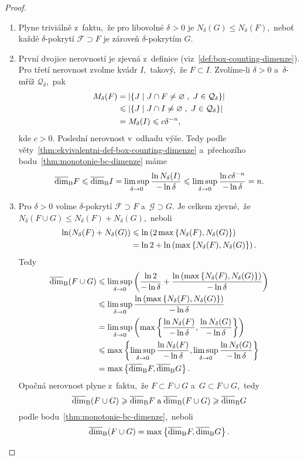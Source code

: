 \begin{proof}
    \begin{enumerate}[label=\textit{(\roman*)}]
        \item Plyne triviálně z~faktu,~že pro libovolné $\delta>0$ je $N_\delta(G)\leqslant N_\delta(F)$,~neboť každé $\delta$-pokrytí $\mathcal{F}\supset F$ je zároveň $\delta$-pokrytím $G$.
        \item První dvojice nerovností je zjevná z~definice (viz~\ref{def:box-counting-dimenze}). Pro třetí nerovnost zvolme kvádr $I$,~takový,~že $F\subset I$. Zvolíme-li $\delta>0$ a~$\delta$-mříž $\mathcal{Q}_\delta$,~pak
        \begin{align*}
            M_\delta(F)&=\left|\left\{J\;\middle|\;J\cap F\neq\varnothing\;,\;J\in\mathcal{Q}_\delta\right\}\right|\\
            &\leqslant \left|\left\{J\;\middle|\;J\cap I\neq\varnothing\;,\;J\in\mathcal{Q}_\delta\right\}\right|\\
            &=M_\delta(I)\leqslant c\delta^{-n},
        \end{align*}
        kde $c>0$. Poslední nerovnost v~odhadu výše. Tedy podle věty~\ref{thm:ekvivalentni-def-box-counting-dimenze} a~přechozího bodu~\ref{thm:monotonie-bc-dimenze} máme
        \[\overline{\dim}_\textup{B}{F}\leqslant\overline{\dim}_\textup{B}{I}=\limsup_{\delta\to 0}\dfrac{\ln{N_\delta(I)}}{-\ln{\delta}}\leqslant\limsup_{\delta\to 0}\dfrac{\ln{c\delta^{-n}}}{-\ln{\delta}}=n.\]
        \item Pro $\delta>0$ volme $\delta$-pokrytí $\mathcal{F}\supset F$ a~$\mathcal{G}\supset G$. Je celkem zjevné,~že $N_\delta(F\cup G)\leqslant N_\delta(F)+N_\delta(G)$,~neboli
        \begin{align*}
            \ln(N_\delta(F)+N_\delta(G))&\leqslant \ln\left(2\max\left\{N_\delta(F),N_\delta(G)\right\}\right)\\
            &=\ln{2}+\ln\left(\max\left\{N_\delta(F),N_\delta(G)\right\}\right).
        \end{align*}
        Tedy
        \begin{align*}
            \overline{\dim}_\textup{B}(F\cup G)&\leqslant\limsup_{\delta\to 0}\left(\dfrac{\ln{2}}{-\ln{\delta}}+\dfrac{\ln\left(\max\left\{N_\delta(F),N_\delta(G)\right\}\right)}{-\ln{\delta}}\right)\\
            &\leqslant\limsup_{\delta\to 0}\dfrac{\ln\left(\max\left\{N_\delta(F),N_\delta(G)\right\}\right)}{-\ln{\delta}}\\
            &=\limsup_{\delta\to 0}\left(\max\left\{\dfrac{\ln{N_\delta(F)}}{-\ln{\delta}},\dfrac{\ln{N_\delta(G)}}{-\ln{\delta}}\right\}\right)\\
            &\leqslant\max\left\{\limsup_{\delta\to 0}\dfrac{\ln{N_\delta(F)}}{-\ln{\delta}},\limsup_{\delta\to 0}\dfrac{\ln{N_\delta(G)}}{-\ln{\delta}}\right\}\\
            &=\max\left\{\overline{\dim}_\textup{B}{F},\overline{\dim}_\textup{B}{G}\right\}.
        \end{align*}
        Opačná nerovnost plyne z~faktu,~že $F\subset F\cup G$ a~$G\subset F\cup G$,~tedy
        \[\overline{\dim}_\textup{B}(F\cup G)\geqslant\overline{\dim}_\textup{B}{F}\;\text{a}\;\overline{\dim}_\textup{B}(F\cup G)\geqslant\overline{\dim}_\textup{B}{G}\]
        podle bodu~\ref{thm:monotonie-bc-dimenze},~neboli
        \[\overline{\dim}_\textup{B}(F\cup G)=\max\left\{\overline{\dim}_\textup{B}{F},\overline{\dim}_\textup{B}{G}\right\}.\]
    \end{enumerate}
\end{proof}
